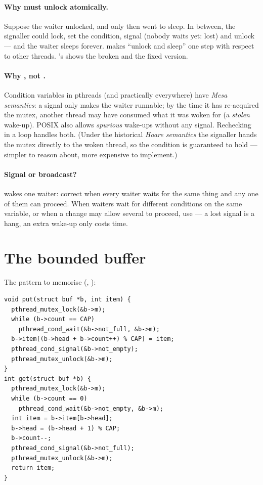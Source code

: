 \paragraph{Why  must unlock atomically.} Suppose the waiter
unlocked, and only then went to sleep. In between, the signaller could
lock, set the condition, signal (nobody waits yet: lost) and unlock --- and
the waiter sleeps forever.  makes ``unlock and
sleep'' one step with respect to other threads. 's
 shows the broken and the fixed version.

\paragraph{Why , not .} Condition variables in
pthreads (and practically everywhere) have \emph{Mesa semantics}: a
signal only makes the waiter runnable; by the time it has re-acquired the
mutex, another thread may have consumed what it was woken for (a
\emph{stolen} wake-up). POSIX also allows \emph{spurious} wake-ups
without any signal. Rechecking in a loop handles both. (Under the
historical \emph{Hoare semantics} the signaller hands the mutex directly
to the woken thread, so the condition is guaranteed to hold --- simpler
to reason about, more expensive to implement.)

\paragraph{Signal or broadcast?}  wakes one waiter: correct
when every waiter waits for the same thing and any one of them can
proceed. When waiters wait for different conditions on the same
variable, or when a change may allow several to proceed, use
 --- a lost signal is a hang, an extra wake-up only costs
time.

\section{The bounded buffer}

The pattern to memorise (, ):

\begin{lstlisting}
void put(struct buf *b, int item) {
  pthread_mutex_lock(&b->m);
  while (b->count == CAP)
    pthread_cond_wait(&b->not_full, &b->m);
  b->item[(b->head + b->count++) % CAP] = item;
  pthread_cond_signal(&b->not_empty);
  pthread_mutex_unlock(&b->m);
}
int get(struct buf *b) {
  pthread_mutex_lock(&b->m);
  while (b->count == 0)
    pthread_cond_wait(&b->not_empty, &b->m);
  int item = b->item[b->head];
  b->head = (b->head + 1) % CAP;
  b->count--;
  pthread_cond_signal(&b->not_full);
  pthread_mutex_unlock(&b->m);
  return item;
}
\end{lstlisting}

